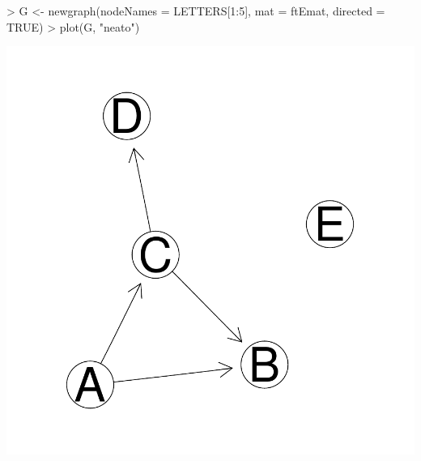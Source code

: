 \documentclass[12pt,oneside,titlepage,letter]{article}
\begin{document}
\begin{center}
\begin{Schunk}
\begin{Sinput}
> G <- newgraph(nodeNames = LETTERS[1:5], mat = ftEmat, directed = TRUE)
> plot(G, "neato")
\end{Sinput}
\end{Schunk}
\includegraphics{sweave_p-036}
\end{center}
\end{document}
